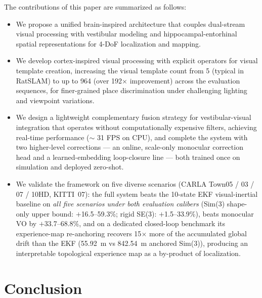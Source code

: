 \documentclass[5p,times]{elsarticle}
\begin{document}
The contributions of this paper are summarized as follows:
\begin{itemize}
    \item We propose a unified brain-inspired architecture that couples dual-stream visual processing with vestibular modeling and hippocampal-entorhinal spatial representations for 4-DoF localization and mapping.
    \item We develop cortex-inspired visual processing with explicit operators for visual template creation, increasing the visual template count from 5 (typical in RatSLAM) to up to 964 (over 192$\times$ improvement) across the evaluation sequences, for finer-grained place discrimination under challenging lighting and viewpoint variations.
    \item We design a lightweight complementary fusion strategy for vestibular-visual integration that operates without computationally expensive filters, achieving real-time performance ($\sim$ 31 FPS on CPU), and complete the system with two higher-level corrections --- an online, scale-only monocular correction head and a learned-embedding loop-closure line --- both trained once on simulation and deployed zero-shot.
    \item We validate the framework on five diverse scenarios (CARLA Town05 / 03 / 07 / 10HD, KITTI~07): the full system beats the 10-state EKF visual-inertial baseline on \emph{all five scenarios under both evaluation calibers} (Sim(3) shape-only upper bound: $+$16.5--59.3\%; rigid SE(3): $+$1.5--33.9\%), beats monocular VO by $+$33.7--68.8\%, and on a dedicated closed-loop benchmark its experience-map re-anchoring recovers 15$\times$ more of the accumulated global drift than the EKF (55.92~m vs 842.54~m anchored Sim(3)), producing an interpretable topological experience map as a by-product of localization.
\end{itemize}











\section{Conclusion}
\label{sec:conclusion}
\end{document}

